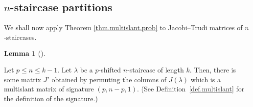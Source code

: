 \documentclass[numbers=enddot,12pt,final,onecolumn,notitlepage]{scrartcl}%
\theoremstyle{definition}
\newtheorem{lem}[theo]{Lemma}
\newenvironment{lemma}[1][]
{\begin{lem}[#1]\begin{leftbar}}
{\end{leftbar}\end{lem}}
\renewcommand{\leq}{\leqslant}
\theoremstyle{plainsl}
\begin{document}
\subsection{$n$-staircase partitions}

We shall now apply Theorem \ref{thm.multislant.prob} to Jacobi--Trudi matrices of $n$-staircases.

\begin{lemma}
\label{multistair}
Let $p \leq n \leq k-1$.
Let $\lambda$ be a $p$-shifted $n$-staircase of length $k$.
Then, there is some matrix $J'$ obtained by permuting the columns of $J(\lambda)$ which is a multislant matrix
of signature $(p, n-p, 1)$.
(See Definition~\ref{def.multislant} for the definition of the signature.)
\end{lemma}

\end{document}
